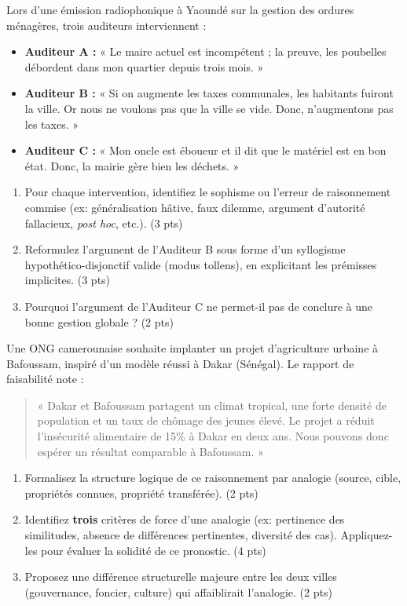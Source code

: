 \documentclass[11pt]{article}
\begin{document}
\begin{exercice}
Lors d'une émission radiophonique à Yaoundé sur la gestion des ordures ménagères, trois auditeurs interviennent :
\begin{itemize}
    \item \textbf{Auditeur A :} « Le maire actuel est incompétent ; la preuve, les poubelles débordent dans mon quartier depuis trois mois. »
    \item \textbf{Auditeur B :} « Si on augmente les taxes communales, les habitants fuiront la ville. Or nous ne voulons pas que la ville se vide. Donc, n'augmentons pas les taxes. »
    \item \textbf{Auditeur C :} « Mon oncle est éboueur et il dit que le matériel est en bon état. Donc, la mairie gère bien les déchets. »
\end{itemize}
\begin{enumerate}
    \item Pour chaque intervention, identifiez le sophisme ou l'erreur de raisonnement commise (ex: généralisation hâtive, faux dilemme, argument d'autorité fallacieux, \textit{post hoc}, etc.). (3 pts)
    \item Reformulez l'argument de l'Auditeur B sous forme d'un syllogisme hypothético-disjonctif valide (modus tollens), en explicitant les prémisses implicites. (3 pts)
    \item Pourquoi l'argument de l'Auditeur C ne permet-il pas de conclure à une bonne gestion globale ? (2 pts)
\end{enumerate}
\end{exercice}

\begin{exercice}
Une ONG camerounaise souhaite implanter un projet d'agriculture urbaine à Bafoussam, inspiré d'un modèle réussi à Dakar (Sénégal). Le rapport de faisabilité note :
\begin{quote}
« Dakar et Bafoussam partagent un climat tropical, une forte densité de population et un taux de chômage des jeunes élevé. Le projet a réduit l'insécurité alimentaire de 15\% à Dakar en deux ans. Nous pouvons donc espérer un résultat comparable à Bafoussam. »
\end{quote}
\begin{enumerate}
    \item Formalisez la structure logique de ce raisonnement par analogie (source, cible, propriétés connues, propriété transférée). (2 pts)
    \item Identifiez \textbf{trois} critères de force d'une analogie (ex: pertinence des similitudes, absence de différences pertinentes, diversité des cas). Appliquez-les pour évaluer la solidité de ce pronostic. (4 pts)
    \item Proposez une différence structurelle majeure entre les deux villes (gouvernance, foncier, culture) qui affaiblirait l'analogie. (2 pts)
\end{enumerate}
\end{exercice}
\end{document}
